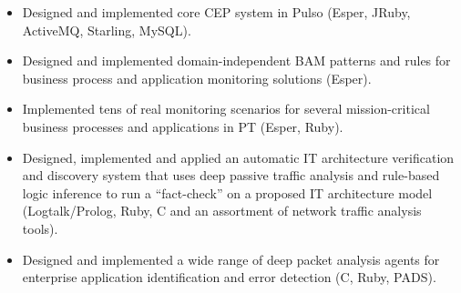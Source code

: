 \documentclass[a4paper,10pt]{scrartcl} %
\begin{document}
\begin{cv}{}
  \Sep




   {
  \begin{itemize}[nosep,noitemsep,leftmargin=3.85em]
    \item Designed and implemented core CEP system in Pulso (Esper, JRuby, ActiveMQ, Starling, MySQL).
    \item Designed and implemented domain-independent BAM patterns and rules for business process and application monitoring solutions (Esper).
    \item Implemented tens of real monitoring scenarios for several mission-critical business processes and applications in PT (Esper, Ruby).
  \end{itemize}
  }

  \Sep


  
   {
  \begin{itemize}[nosep,noitemsep,leftmargin=3.85em]
    \item Designed, implemented and applied an automatic IT architecture verification and discovery system that uses deep passive traffic analysis and rule-based logic inference to run a ``fact-check'' on a proposed IT architecture model (Logtalk/Prolog, Ruby, C and an assortment of network traffic analysis tools).
    \item Designed and implemented a wide range of deep packet analysis agents for enterprise application identification and error detection (C, Ruby, PADS).
  \end{itemize}
  }

  \Sep




\end{cv}
\end{document}
